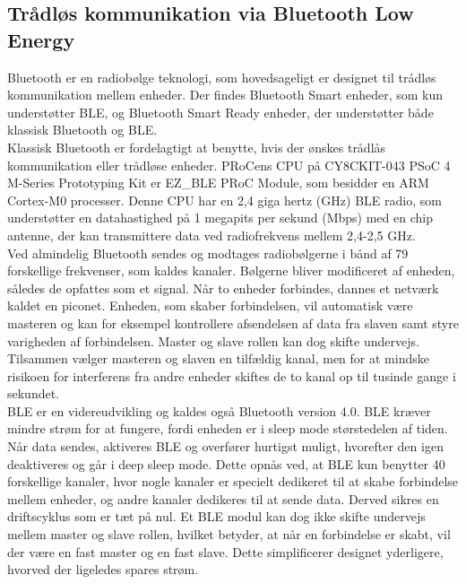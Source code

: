 \subsection{Trådløs kommunikation via Bluetooth Low Energy} 
Bluetooth er en radiobølge teknologi, som hovedsageligt er designet til trådløs kommunikation mellem enheder. Der findes Bluetooth Smart enheder, som kun understøtter BLE, og Bluetooth Smart Ready enheder, der understøtter både klassisk Bluetooth og BLE. \\
Klassisk Bluetooth er fordelagtigt at benytte, hvis der ønskes trådlås kommunikation eller trådløse enheder. PRoCens CPU på CY8CKIT-043 PSoC 4 M-Series Prototyping Kit er EZ\_BLE PRoC Module, som besidder en ARM Cortex-M0 processer. %
Denne CPU har en 2,4 giga hertz (GHz) BLE radio, som understøtter en datahastighed på 1 megapits per sekund (Mbps) med en chip antenne, der kan transmittere data ved radiofrekvens mellem 2,4-2,5 GHz. %
\citep{Semiconductor2016PRoC,Semiconductor2016BLEdyb}\\
Ved almindelig Bluetooth sendes og modtages radiobølgerne i bånd af 79 forskellige frekvenser, som kaldes kanaler. Bølgerne bliver modificeret af enheden, således de opfattes som et signal. Når to enheder forbindes, dannes et netværk kaldet en piconet. Enheden, som skaber forbindelsen, vil automatisk være masteren og kan for eksempel kontrollere afsendelsen af data fra slaven samt styre varigheden af forbindelsen. Master og slave rollen kan dog skifte undervejs. Tilsammen vælger masteren og slaven en tilfældig kanal, men for at mindske risikoen for interferens fra andre enheder skiftes de to kanal op til tusinde gange i sekundet. \citep{CYPRESS2016workshopBLE,Sauter2011} \\
BLE er en videreudvikling og kaldes også Bluetooth version 4.0. BLE kræver mindre strøm for at fungere, fordi enheden er i sleep mode størstedelen af tiden. Når data sendes, aktiveres BLE og overfører hurtigst muligt, hvorefter den igen deaktiveres og går i deep sleep mode. Dette opnås ved, at BLE kun benytter 40 forskellige kanaler, hvor nogle kanaler er specielt dedikeret til at skabe forbindelse mellem enheder, og andre kanaler dedikeres til at sende data. Derved sikres en driftscyklus som er tæt på nul. Et BLE modul kan dog ikke skifte undervejs mellem master og slave rollen, hvilket betyder, at når en forbindelse er skabt, vil der være en fast master og en fast slave. Dette simplificerer designet yderligere, hvorved der ligeledes spares strøm. \citep{Gupta2013}